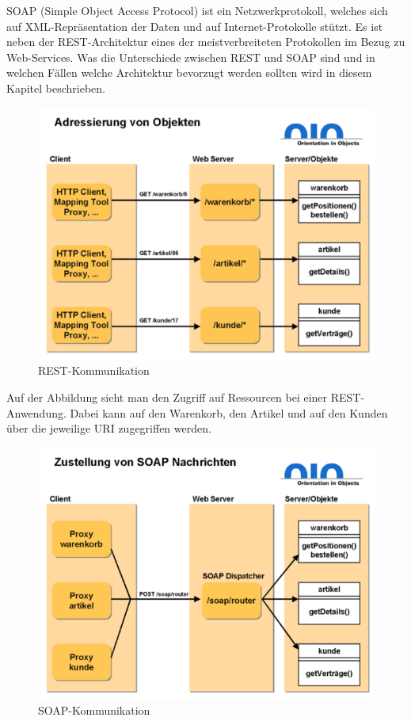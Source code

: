 
SOAP (Simple Object Access Protocol) ist ein Netzwerkprotokoll, welches sich auf XML-Repräsentation der Daten und auf Internet-Protokolle stützt. Es ist neben der REST-Architektur eines der meistverbreiteten Protokollen im Bezug zu Web-Services. Was die Unterschiede zwischen REST und SOAP sind und in welchen Fällen welche Architektur bevorzugt werden sollten wird in diesem Kapitel beschrieben. 

\begin{figure}[H]
    \centering
    \includegraphics{media/REST/restcomm.png}
    \caption{REST-Kommunikation \cite{RestSoap}}
\end{figure}

Auf der Abbildung sieht man den Zugriff auf Ressourcen bei einer REST-Anwendung. Dabei kann auf den Warenkorb, den Artikel und auf den Kunden über die jeweilige URI zugegriffen werden. 

\begin{figure}[H]
    \centering
    \includegraphics{media/REST/soapcomm.png}
    \caption{SOAP-Kommunikation \cite{RestSoap}}
\end{figure}

